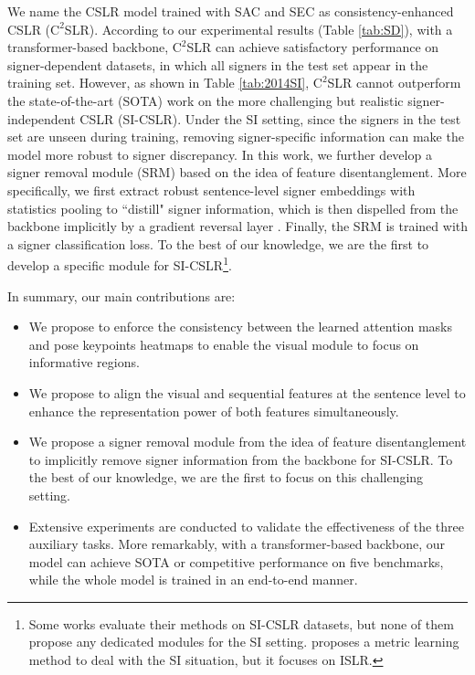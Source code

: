\documentclass[acmsmall,screen]{acmart}
\begin{document}
We name the CSLR model trained with SAC and SEC as consistency-enhanced CSLR ($\text{C}^2$SLR).
According to our experimental results (Table \ref{tab:SD}), with a transformer-based backbone, $\text{C}^2$SLR can achieve satisfactory performance on signer-dependent datasets, in which all signers in the test set appear in the training set.
However, as shown in Table \ref{tab:2014SI}, $\text{C}^2$SLR cannot outperform the state-of-the-art (SOTA) work on the more challenging but realistic signer-independent CSLR (SI-CSLR).
Under the SI setting, since the signers in the test set are unseen during training, removing signer-specific information can make the model more robust to signer discrepancy.
In this work, we further develop a signer removal module (SRM) based on the idea of feature disentanglement.
More specifically, we first extract robust sentence-level signer embeddings with statistics pooling \cite{snyder2018x} to ``distill" signer information, which is then dispelled from the backbone implicitly by a gradient reversal layer \cite{ganin2016domain}.
Finally, the SRM is trained with a signer classification loss.
To the best of our knowledge, we are the first to develop a specific module for SI-CSLR\footnote{Some works \cite{dnf, cma} evaluate their methods on SI-CSLR datasets, but none of them propose any dedicated modules for the SI setting. \cite{yin2016iterative} proposes a metric learning method to deal with the SI situation, but it focuses on ISLR.}.

In summary, our main contributions are:
\begin{itemize}
\item We propose to enforce the consistency between the learned attention masks and pose keypoints heatmaps to enable the visual module to focus on informative regions.
    \item We propose to align the visual and sequential features at the sentence level to enhance the representation power of both features simultaneously.
    \item We propose a signer removal module from the idea of feature disentanglement to implicitly remove signer information from the backbone for SI-CSLR. To the best of our knowledge, we are the first to focus on this challenging setting.
    \item Extensive experiments are conducted to validate the effectiveness of the three auxiliary tasks. More remarkably, with a transformer-based backbone, our model can achieve SOTA or competitive performance on five benchmarks, while the whole model is trained in an end-to-end manner.
\end{itemize}
\end{document}
